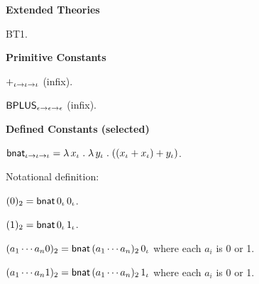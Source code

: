 \begin{biformthy}\em
\bi

  \item[]

  \item[] \textbf{Extended Theories} 

  \be

    \item BT1.

  \ee


  \item[] \textbf{Primitive Constants}

  \be

    \setcounter{enumi}{2}

    \item $+_{\iota \rightarrow \iota \rightarrow \iota}$ (infix).

    \item $\mbox{\sf BPLUS}_{\epsilon \rightarrow \epsilon \rightarrow \epsilon}$ (infix).

  \ee

  \item[] \textbf{Defined Constants (selected)}

  \be

    \setcounter{enumi}{2}

    \item $\mbox{\sf bnat}_{\iota \rightarrow \iota \rightarrow \iota} =
      \lambda\, x_\iota \mathrel. \lambda\, y_\iota \mathrel. ((x_\iota +
      x_\iota) + y_\iota)$.
      
    Notational definition:

    \bi

      \item[] $(0)_2 = \mbox{\sf bnat} \, 0_\iota \, 0_\iota$.
  
      \item[] $(1)_2 = \mbox{\sf bnat} \, 0_\iota \, 1_\iota$.
  
      \item[] $(a_1 \cdots a_n0)_2 = \mbox{\sf bnat} \, (a_1 \cdots
        a_n)_2 \, 0_\iota$ {\sglsp} where each $a_i$ is 0 or 1.
  
      \item[] $(a_1 \cdots a_n1)_2 = \mbox{\sf bnat} \, (a_1 \cdots
        a_n)_2 \, 1_\iota$ {\sglsp} where each $a_i$ is 0 or 1.
  
    \ei


\end{biformthy}
